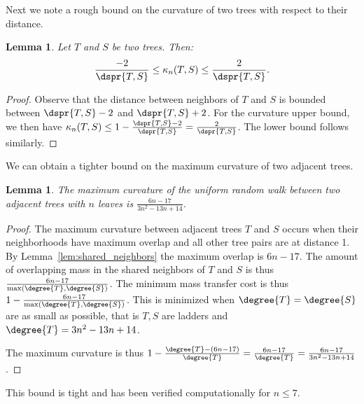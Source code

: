 \documentclass[11pt,onecolumn,conference]{IEEEtran}
\newtheorem{lemma}[theorem]{Lemma}
\newcommand{\curvature}[2][]{%
    \ifthenelse{\equal{#1}{}}%
		{\kappa_n(#2)}%
		{\kappa_n(#1;#2)}%
}
\begin{document}
Next we note a rough bound on the curvature of two trees with respect to their distance.

\begin{lemma}
	\label{lem:curvature_distance_bound}
	Let $T$ and $S$ be two trees. Then:
	$$ \frac{-2}{\dspr{T,S}} \le \curvature{T,S} \le \frac{2}{\dspr{T,S}} .$$
\end{lemma}
\begin{proof}
	Observe that the distance between neighbors of $T$ and $S$ is bounded between $\dspr{T,S} - 2$ and $\dspr{T,S} + 2$.
	For the curvature upper bound, we then have $\curvature{T,S} \le 1 - \frac{\dspr{T,S} - 2}{\dspr{T,S}} = \frac{2}{\dspr{T,S}}$.
	The lower bound follows similarly.
\end{proof}

We can obtain a tighter bound on the maximum curvature of two adjacent trees.
\begin{lemma}
	The maximum curvature of the uniform random walk between two adjacent trees with $n$ leaves is $\frac{6n-17}{3n^2-13n+14}$.
\end{lemma}
\begin{proof}
The maximum curvature between adjacent trees $T$ and $S$ occurs when their neighborhoods have maximum overlap and all other tree pairs are at distance 1.
By Lemma~\ref{lem:shared_neighbors} the maximum overlap is $6n-17$.
The amount of overlapping mass in the shared neighbors of $T$ and $S$ is thus $\frac{6n-17}{\max(\degree{T},\degree{S})}$.
The minimum mass transfer cost is thus $1 - \frac{6n-17}{\max(\degree{T},\degree{S})}$.
This is minimized when $\degree{T}=\degree{S}$ are as small as possible, that is $T,S$ are ladders and $\degree{T} = 3n^2 - 13n + 14$.

The maximum curvature is thus $1 - \frac{\degree{T} - (6n-17)}{\degree{T}} = \frac{6n - 17}{\degree{T}}= \frac{6n-17}{3n^2-13n+14}$.
\end{proof}
This bound is tight and has been verified computationally for $n \le 7$.
\end{document}
